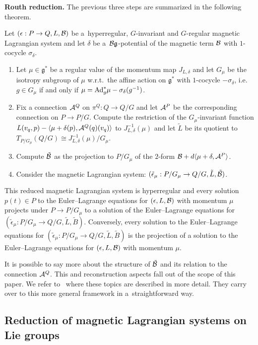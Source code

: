 \documentclass[pdftex]{sigma}
\newcommand{\A}{{\cal A}}
\newcommand{\B}{{\cal B}}
\newcommand{\e}{\epsilon}
\newcommand{\lag}{\mathfrak{g}}
\begin{document}
{\bf Routh reduction.} The previous three steps are summarized in the following theorem.
\begin{theorem}\label{thm:routh}
  Let $(\e:P\to Q,L,\B)$ be a~hyperregular, $G$-invariant and $G$-regular magnetic Lagrangian system and let $\delta$ be a~$\B\lag$-potential of the magnetic term $\B$ with $1$-cocycle $\sigma_\delta$.
  \begin{enumerate}\itemsep=0pt
  \item[$1.$] Let $\mu\in\lag^*$ be a regular value of the momentum map $J_{L,\delta}$ and let $G_\mu$ be the isotropy subgroup of $\mu$ w.r.t.\ the affine action on $\lag^*$ with $1$-cocycle $-\sigma_\delta$, i.e.\ $g\in G_\mu$ if and only if $\mu = {\rm Ad}^*_g\mu -\sigma_\delta(g^{-1})$.
  \item[$2.$] Fix a connection $\A^Q$ on $\pi^Q:Q\to Q/G$ and let $\A^P$ be the corresponding connection on $P\to P/G$. Compute the restriction of the $G_\mu$-invariant function $L(v_q,p)-\langle \mu+\delta(p),\A^Q(q)(v_q)\rangle$ to  $J^{-1}_{L,\delta}(\mu)$ and let $\tilde L$ be its quotient  to $T_{P/G_\mu}(Q/G) \cong J^{-1}_{L,\delta}(\mu)/G_\mu$.
 \item[$3.$] Compute $\tilde\B$ as the projection to $P/G_\mu$ of the $2$-form $\B+d\langle \mu+\delta,\A^P\rangle$.
\item[$4.$]  Consider the magnetic Lagrangian system: $(\tilde\e_\mu:P/G_\mu \to Q/G, \tilde L, \tilde \B)$.
 \end{enumerate}

 This reduced magnetic Lagrangian system is hyperregular and every solution $p(t)\in P$ to the Euler--Lagrange equations for $(\e,L,\B)$ with momentum $\mu$ projects under $P\to P/G_\mu$ to a solution of the Euler--Lagrange equations for $(\tilde\e_\mu:P/G_\mu \to Q/G, \tilde L, \tilde B)$. Conversely, every solution to the Euler--Lagrange equations for $(\tilde\e_\mu:P/G_\mu \to Q/G,\tilde L, \tilde B)$ is the projection of a solution to the Euler--Lagrange equations for $(\e,L,\B)$ with momentum $\mu$.
\end{theorem}

It is possible to say more about the structure of $\tilde \B$ and its relation to the connection $\A^Q$.  This and reconstruction aspects fall out of the scope of this paper. We refer to~\cite{BM} where these topics are described in more detail. They carry over to this more general framework in a~straightforward way.


\subsection{Reduction of magnetic Lagrangian systems on Lie groups}
\label{sec:liegroups}
\end{document}

